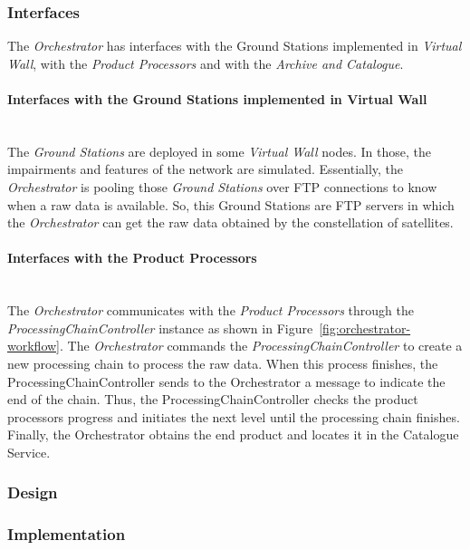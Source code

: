 \begin{enumerate}
\subsubsection{Interfaces}

The \emph{Orchestrator} has interfaces with the Ground Stations implemented in
\emph{Virtual Wall}, with the \emph{Product Processors} and with the
\emph{Archive and Catalogue}.

\paragraph{Interfaces with the Ground Stations implemented in Virtual Wall}~\\
The \emph{Ground Stations} are deployed in some \emph{Virtual Wall} nodes. In those, the impairments and features of the network are simulated. Essentially, the \emph{Orchestrator} is pooling those \emph{Ground Stations} over \ac{FTP} connections to know when a raw data is available. So, this Ground Stations are \ac{FTP} servers in which the \emph{Orchestrator} can get the raw data obtained by the constellation of satellites.

\paragraph{Interfaces with the Product Processors}~\\
The \emph{Orchestrator} communicates with the \emph{Product Processors} through the \emph{ProcessingChainController} instance as shown in Figure~\ref{fig:orchestrator-workflow}. The \emph{Orchestrator} commands the \emph{ProcessingChainController} to create a new processing chain to process the raw data. When this process finishes, the ProcessingChainController sends to the Orchestrator a message to indicate the end of the chain. Thus, the ProcessingChainController checks the product processors progress and initiates the next level until the processing chain finishes. Finally, the Orchestrator obtains the end product and locates it in the Catalogue Service. 

\subsubsection{Design}

\subsubsection{Implementation}


\end{enumerate}
